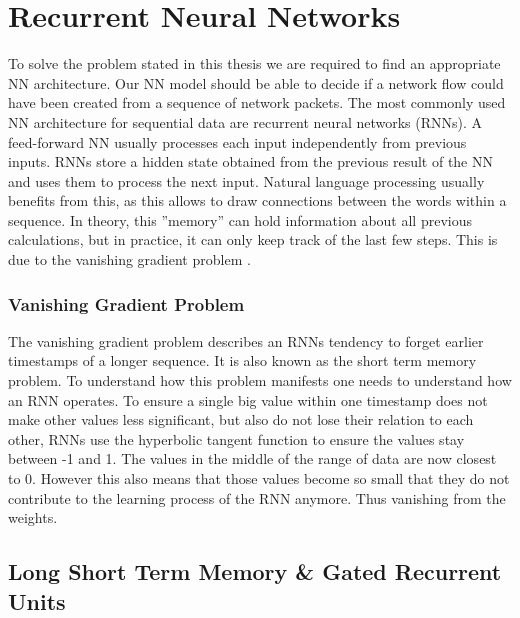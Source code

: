 \documentclass[
	ngerman,
	ruledheaders=section,%
	class=report,%
	thesis={type=bachelor},%
	accentcolor=9c,%
	custommargins=true,%
	marginpar=false,%
	parskip=half-,%
	fontsize=11pt,%
	twoside
]{tudapub}
\begin{document}
\section{Recurrent Neural Networks}
\label{sec:RNN}

To solve the problem stated in this thesis we are required to find an appropriate NN architecture.
Our NN model should be able to decide if a network flow could have been created from a sequence of network packets.
The most commonly used NN architecture for sequential data are recurrent neural networks (RNNs).
A feed-forward NN usually processes each input independently from previous inputs.
RNNs store a hidden state obtained from the previous result of the NN and uses them to process the next input.
Natural language processing usually benefits from this, as this allows to draw connections between the words within a sequence.
In theory, this ''memory'' can hold information about all previous calculations,
but in practice, it can only keep track of the last few steps.
This is due to the vanishing gradient problem \cite{hochreiterLongShortTermMemory1997}.

\subsubsection{Vanishing Gradient Problem}
\label{sec:vanishing}

The vanishing gradient problem describes an RNNs tendency to forget earlier timestamps of a longer sequence.
It is also known as the short term memory problem.
To understand how this problem manifests one needs to understand how an RNN operates.
To ensure a single big value within one timestamp does not make other values less significant, but also do not lose their relation to each other, RNNs use the hyperbolic tangent function to ensure the values stay between -1 and 1.
The values in the middle of the range of data are now closest to 0.
However this also means that those values become so small that they do not contribute to the learning process of the RNN anymore.
Thus vanishing from the weights.

\subsection{Long Short Term Memory \& Gated Recurrent Units}
\label{sec:LSTMandGRU}
\end{document}
